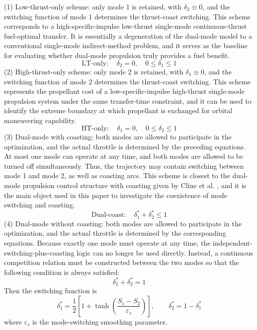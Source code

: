 ﻿\documentclass{IEEEtaes}
\begin{document}
(1) Low-thrust-only scheme: only mode 1 is retained, with $\delta_2\equiv0$, and the switching function of mode 1 determines the thrust-coast switching. This scheme corresponds to a high-specific-impulse low-thrust single-mode continuous-thrust fuel-optimal transfer. It is essentially a degeneration of the dual-mode model to a conventional single-mode indirect-method problem, and it serves as the baseline for evaluating whether dual-mode propulsion truly provides a fuel benefit.
\begin{equation}
\text{LT-only}:\quad \delta_2=0,\quad 0\leq\delta_1\leq1
\end{equation}
(2) High-thrust-only scheme: only mode 2 is retained, with $\delta_1\equiv0$, and the switching function of mode 2 determines the thrust-coast switching. This scheme represents the propellant cost of a low-specific-impulse high-thrust single-mode propulsion system under the same transfer-time constraint, and it can be used to identify the extreme boundary at which propellant is exchanged for orbital maneuvering capability.
\begin{equation}
\text{HT-only}:\quad \delta_1=0,\quad 0\leq\delta_2\leq1
\end{equation}
(3) Dual-mode with coasting: both modes are allowed to participate in the optimization, and the actual throttle is determined by the preceding equations. At most one mode can operate at any time, and both modes are allowed to be turned off simultaneously. Thus, the trajectory may contain switching between mode 1 and mode 2, as well as coasting arcs. This scheme is closest to the dual-mode propulsion control structure with coasting given by Cline et al. \cite{cline2024a}, and it is the main object used in this paper to investigate the coexistence of mode switching and coasting.
\begin{equation}
\text{Dual-coast}:\quad \delta_1^{*}+\delta_2^{*}\leq1
\end{equation}
(4) Dual-mode without coasting: both modes are allowed to participate in the optimization, and the actual throttle is determined by the corresponding equations. Because exactly one mode must operate at any time, the independent-switching-plus-coasting logic can no longer be used directly. Instead, a continuous competition relation must be constructed between the two modes so that the following condition is always satisfied:
\begin{equation}
\delta_1^{*}+\delta_2^{*}=1
\end{equation}
Then the switching function is
\begin{equation}
\delta_1^{*}=\frac{1}{2}\left[1+\tanh\left(\frac{S_1-S_2}{\varepsilon_s}\right)\right],\qquad \delta_2^{*}=1-\delta_1^{*}
\end{equation}
where $\varepsilon_s$ is the mode-switching smoothing parameter.
\end{document}
